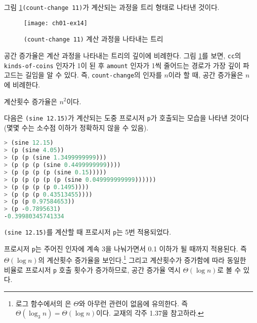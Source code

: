
그림 \ref{fig:count-change}\는 \texttt{(count-change 11)}가 계산되는 과정을 트리
형태로 나타낸 것이다.

\begin{figure}[t]
  \centering
  \texttt{[image: ch01-ex14]}
  \caption{\texttt{(count-change 11)} 계산 과정을 나타내는 트리}
  \label{fig:count-change}
\end{figure}

공간 증가율은 계산 과정을 나타내는 트리의 깊이에 비례한다. 그림
\ref{fig:count-change}를 보면, \texttt{cc}의 \texttt{kinds-of-coins} 인자가
1이 된 후 \texttt{amount} 인자가 1씩 줄어드는 경로가 가장 깊이 파고드는 길임을
알 수 있다. 즉, \texttt{count-change}의 인자를 $n$이라 할 때, 공간 증가율은
$n$에 비례한다.

계산횟수 증가율은 $n^2$이다. \TODO


다음은 \texttt{(sine 12.15)}가 계산되는 도중 프로시저 \texttt{p}가 호출되는
모습을 나타낸 것이다 (몇몇 수는 소수점 이하가 정확하지 않을 수 있음).

\begin{lstlisting}[language=Scheme]
> (sine 12.15)
> (p (sine 4.05))
> (p (p (sine 1.3499999999)))
> (p (p (p (sine 0.4499999999))))
> (p (p (p (p (sine 0.15)))))
> (p (p (p (p (p (sine 0.049999999999))))))
> (p (p (p (p 0.1495))))
> (p (p (p 0.43513455))))
> (p (p 0.97584653))
> (p -0.7895631)
-0.39980345741334
\end{lstlisting}

\begin{MyEnum}
\item \texttt{(sine 12.15)}를 계산할 때 프로시저 \texttt{p}는 5번 적용되었다.
\item 프로시저 \texttt{p}는 주어진 인자에 계속 3을 나눠가면서 0.1 이하가 될
  때까지 적용된다. 즉 $\Theta(\log n)$의 계산횟수 증가율을
  보인다.\footnote{로그 함수에서의 은 $\Theta$와 아무런 관련이
    없음에 유의한다. 즉 $\Theta(\log_3 n) = \Theta(\log n)$이다. 교재의 각주 1.37을
    참고하라.} 그리고
  계산횟수가 증가함에 따라 동일한 비율로 프로시저 \texttt{p} 호출 횟수가
  증가하므로, 공간 증가율 역시 $\Theta(\log n)$로 볼 수 있다.
\end{MyEnum}


